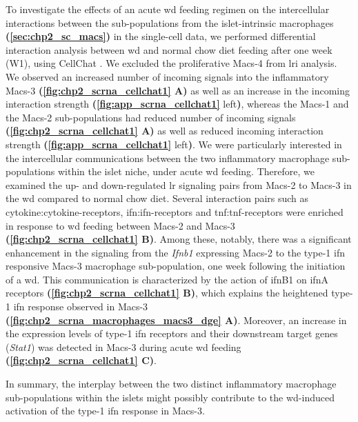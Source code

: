 To investigate the effects of an acute \gls{wd} feeding regimen on the intercellular interactions between the sub-populations from the islet-intrinsic macrophages \textbf{(\autoref{sec:chp2_sc_macs})} in the single-cell data, we performed differential interaction analysis between \gls{wd} and normal chow diet feeding after one week (W1), using CellChat \textbf{\cite{jin_cellchat_2023}}. We excluded the proliferative Macs-4 from \gls{lri} analysis. We observed an increased number of incoming signals into the inflammatory Macs-3 \textbf{(\autoref{fig:chp2_scrna_cellchat1} A)} as well as an increase in the incoming interaction strength \textbf{(\autoref{fig:app_scrna_cellchat1}} left\textbf{)}, whereas the Macs-1 and the Macs-2 sub-populations had reduced number of incoming signals \textbf{(\autoref{fig:chp2_scrna_cellchat1} A)} as well as reduced incoming interaction strength \textbf{(\autoref{fig:app_scrna_cellchat1}} left\textbf{)}. We were particularly interested in the intercellular communications between the two inflammatory macrophage sub-populations within the islet niche, under acute \gls{wd} feeding. Therefore, we examined the up- and down-regulated \gls{lr} signaling pairs from Macs-2 to Macs-3 in the \gls{wd} compared to normal chow diet. Several interaction pairs such as cytokine:cytokine-receptors, \gls{ifn}:\gls{ifn}-receptors and \gls{tnf}:\gls{tnf}-receptors were enriched in response to \gls{wd} feeding between Macs-2 and Macs-3 \textbf{(\autoref{fig:chp2_scrna_cellchat1} B)}. Among these, notably, there was a significant enhancement in the signaling from the \textit{Ifnb1} expressing Macs-2 to the type-1 \gls{ifn} responsive Macs-3 macrophage sub-population, one week following the initiation of a \gls{wd}. This communication is characterized by the action of \gls{ifn}B1 on \gls{ifn}A receptors \textbf{(\autoref{fig:chp2_scrna_cellchat1} B)}, which explains the heightened type-1 \gls{ifn} response observed in Macs-3 \textbf{(\autoref{fig:chp2_scrna_macrophages_macs3_dge} A)}. Moreover, an increase in the expression levels of type-1 \gls{ifn} receptors and their downstream target genes (\textit{Stat1}) was detected in Macs-3 during acute \gls{wd} feeding \textbf{(\autoref{fig:chp2_scrna_cellchat1} C)}.\\

\par In summary, the interplay between the two distinct inflammatory macrophage sub-populations within the islets might possibly contribute to the \gls{wd}-induced activation of the type-1 \gls{ifn} response in Macs-3. 

